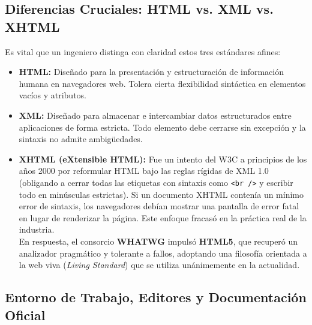 \subsection{Diferencias Cruciales: HTML vs. XML vs. XHTML}

Es vital que un ingeniero distinga con claridad estos tres estándares afines:

\begin{itemize}[leftmargin=1.2cm]
  \item \textbf{HTML:} Diseñado para la presentación y estructuración de información humana en navegadores web. Tolera cierta flexibilidad sintáctica en elementos vacíos y atributos.
  \item \textbf{XML:} Diseñado para almacenar e intercambiar datos estructurados entre aplicaciones de forma estricta. Todo elemento debe cerrarse sin excepción y la sintaxis no admite ambigüedades.
  \item \textbf{XHTML (eXtensible HTML):} Fue un intento del W3C a principios de los años 2000 por reformular HTML bajo las reglas rígidas de XML 1.0 (obligando a cerrar todas las etiquetas con sintaxis como \texttt{<br />} y escribir todo en minúsculas estrictas). Si un documento XHTML contenía un mínimo error de sintaxis, los navegadores debían mostrar una pantalla de error fatal en lugar de renderizar la página. Este enfoque fracasó en la práctica real de la industria.\\
  En respuesta, el consorcio \textbf{WHATWG} impulsó \textbf{HTML5}, que recuperó un analizador pragmático y tolerante a fallos, adoptando una filosofía orientada a la web viva (\textit{Living Standard}) que se utiliza unánimemente en la actualidad.
\end{itemize}

\subsection{Entorno de Trabajo, Editores y Documentación Oficial}

